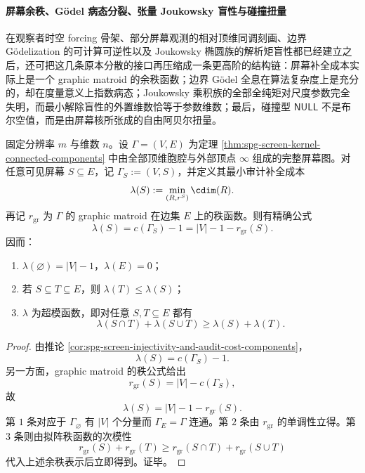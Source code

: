 \paragraph{屏幕余秩、Gödel 病态分裂、张量 Joukowsky 盲性与碰撞扭量}
在观察者时空 forcing 骨架、部分屏幕观测的相对顶维同调刻画、边界 Gödelization 的可计算可逆性以及 Joukowsky 椭圆族的解析矩盲性都已经建立之后，还可把这几条原本分散的接口再压缩成一条更高阶的结构链：屏幕补全成本实际上是一个 graphic matroid 的余秩函数；边界 Gödel 全息在算法复杂度上是充分的，却在度量意义上指数病态；Joukowsky 乘积族的全部全纯矩对尺度参数完全失明，而最小解除盲性的外置维数恰等于参数维数；最后，碰撞型 \(\mathsf{NULL}\) 不是布尔空值，而是由屏幕核所张成的自由阿贝尔扭量。

\begin{theorem}[屏幕审计成本的图拟阵余秩表示与超模性]\label{thm:conclusion-screen-graphic-matroid-corank-supermodularity}
固定分辨率 \(m\) 与维数 \(n\)。设 \(\Gamma=(V,E)\) 为定理 \ref{thm:spg-screen-kernel-connected-components} 中由全部顶维胞腔与外部顶点 \(\infty\) 组成的完整屏幕图。对任意可见屏幕 \(S\subseteq E\)，记 \(\Gamma_S:=(V,S)\)，并定义其最小审计补全成本
\[
\lambda(S):=\min_{(R,r^S)}\cdim(R).
\]
再记 \(r_{\mathrm{gr}}\) 为 \(\Gamma\) 的 graphic matroid 在边集 \(E\) 上的秩函数。则有精确公式
\[
\lambda(S)=c(\Gamma_S)-1=|V|-1-r_{\mathrm{gr}}(S).
\]
因而：
\begin{enumerate}
  \item \(\lambda(\varnothing)=|V|-1\)，\(\lambda(E)=0\)；
  \item 若 \(S\subseteq T\subseteq E\)，则 \(\lambda(T)\le \lambda(S)\)；
  \item \(\lambda\) 为超模函数，即对任意 \(S,T\subseteq E\) 都有
        \[
        \lambda(S\cap T)+\lambda(S\cup T)\ge \lambda(S)+\lambda(T).
        \]
\end{enumerate}
\end{theorem}

\begin{proof}
由推论 \ref{cor:spg-screen-injectivity-and-audit-cost-components}，
\[
\lambda(S)=c(\Gamma_S)-1.
\]
另一方面，graphic matroid 的秩公式给出
\[
r_{\mathrm{gr}}(S)=|V|-c(\Gamma_S),
\]
故
\[
\lambda(S)=|V|-1-r_{\mathrm{gr}}(S).
\]
第 \(1\) 条对应于 \(\Gamma_\varnothing\) 有 \(|V|\) 个分量而 \(\Gamma_E=\Gamma\) 连通。第 \(2\) 条由 \(r_{\mathrm{gr}}\) 的单调性立得。第 \(3\) 条则由拟阵秩函数的次模性
\[
r_{\mathrm{gr}}(S)+r_{\mathrm{gr}}(T)\ge r_{\mathrm{gr}}(S\cap T)+r_{\mathrm{gr}}(S\cup T)
\]
代入上述余秩表示后立即得到。证毕。
\end{proof}

